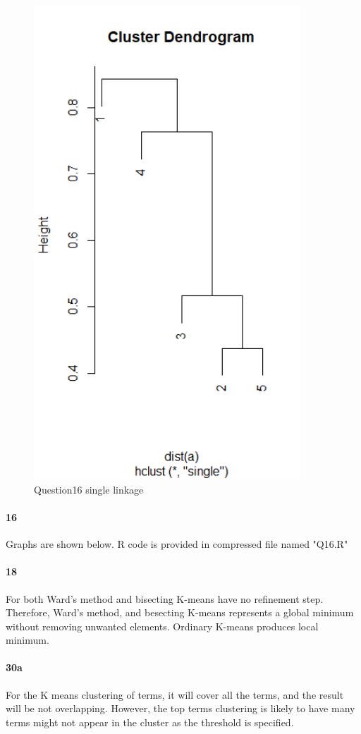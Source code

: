 \documentclass{article}
\begin{document}
\begin{figure}
  \includegraphics[width=100mm, scale = 0.5]{single16.png}
  \caption{Question16 single linkage}
\end{figure}
\paragraph{16}
Graphs are shown below. R code is provided in compressed file named "Q16.R"
\paragraph{18}
For both Ward's method and bisecting K-means have no refinement step.\\
Therefore, Ward's method, and besecting K-means represents a global minimum without removing unwanted elements. Ordinary K-means produces local minimum.
\paragraph{30a}
For the K means clustering of terms, it will cover all the terms, and the result will be not overlapping. However, the top terms clustering is likely to have many terms might not appear in the cluster as the threshold is specified.
\end{document}
